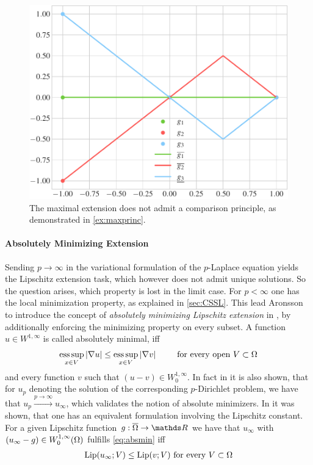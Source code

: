 %
\begin{figure}
\centering
\includegraphics[width=.5\textwidth]{code/lipextcomp/comp.pdf}
\caption[Visualization for \cref{ex:maxprinc}.]{The maximal extension does not admit a comparison principle, as demonstrated in \cref{ex:maxprinc}.}\label{fig:maxprinc}
\end{figure}
%
%
\paragraph{Absolutely Minimizing Extension}\label{sec:AMLE}
%
Sending $p\to\infty$ in the variational formulation of the $p$-Laplace equation 
yields the Lipschitz extension task, which however does not admit unique solutions. So the question arises, which property is lost in the limit case. For $p<\infty$ one has the local minimization property, as explained in \cref{sec:CSSL}. This lead Aronsson to introduce the concept of \emph{absolutely minimizing Lipschitz extension} in \cite{aronsson1967extension}, by additionally enforcing the minimizing property on every subset. A function $u\in W^{1,\infty}$ is called absolutely minimal, iff
%
\begin{align}\label{eq:absmin}
\operatorname*{ess\,sup}_{x\in V} \left|\nabla u\right| \leq \operatorname*{ess\,sup}_{x\in V} \left|\nabla v\right| \qquad\text{ for every open } V\subset \Omega
\end{align}
%
and every function $v$ such that $(u-v)\in W^{1,\infty}_0$. In fact in \cite{aronsson1967extension} it is also shown, that for $u_p$ denoting the solution of the corresponding $p$-Dirichlet problem, we have that 
$u_p\xrightarrow{p\to\infty} u_\infty$, which validates the notion of absolute minimizers. In \cite{aronsson2004tour} it was shown, that one has an equivalent formulation involving the Lipschitz constant. For a given Lipschitz function $g:\overline{\domain}\to\R$ we have that $u_\infty$ with $(u_\infty-g)\in W^{1,\infty}_0(\Omega)$ fulfills \cref{eq:absmin} iff
%
\begin{align*}
\operatorname{Lip}(u_\infty; V) \leq \operatorname{Lip}(v; V) \text{ for every } V\subset \Omega
\end{align*}
